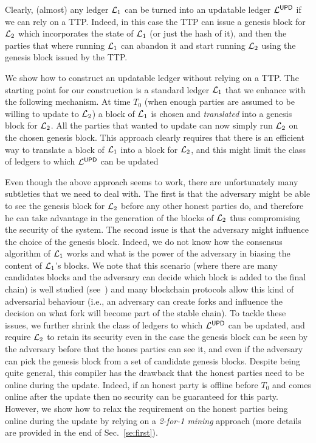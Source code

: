 Clearly, (almost) any ledger $\mathcal{L}_1$ can be turned into an updatable ledger $\mathcal{L}^\mathsf{UPD}$ 
if we can rely on a TTP.
Indeed, in this case the  TTP can issue a genesis block for $\mathcal{L}_2$ which incorporates the state of $\mathcal{L}_1$ (or just the hash of it), and then the parties that where running $\mathcal{L}_1$ can abandon it and start running 
$\mathcal{L}_2$ using the genesis block issued by the TTP.

We show how to construct an updatable ledger without relying on a TTP. The starting point for our construction is
a standard ledger $\mathcal{L}_1$ that we enhance with the following mechanism. At time $T_0$ (when enough parties are assumed to be willing to update to $\mathcal{L}_2$)
a block of $\mathcal{L}_1$ is chosen and \emph{translated} into a genesis block for $\mathcal{L}_2$. All the parties that wanted to update can now simply run $\mathcal{L}_2$ on the chosen genesis block.
This approach clearly requires that there is an efficient way to translate a block of $\mathcal{L}_1$ into a block for $\mathcal{L}_2$, and this might limit the class of ledgers to which $\mathcal{L}^\mathsf{UPD}$ can be updated

Even though the above approach seems to work, there are unfortunately many subtleties that we need to deal with.
The first is that the adversary might be able to see the genesis block for $\mathcal{L}_2$ before any other honest parties do, and therefore he can take advantage in the generation of the blocks of $\mathcal{L}_2$ thus compromising the security of the system. 
The second issue is that the adversary might influence the choice of the genesis block. Indeed, we do not know how the consensus algorithm of $\mathcal{L}_1$ works and what is the power of the adversary in biasing the content of $\mathcal{L}_1$'s blocks. We note that this scenario (where there are many candidates blocks and the adversary can decide which block is added to the final chain) is well studied (see~\cite{EC:GarKiaLeo15}) and many blockchain protocols allow this kind of adversarial behaviour (i.e., an adversary can create forks and influence the decision on what fork will become part of the stable chain). 
To tackle these issues, we further shrink the class of ledgers to which $\mathcal{L}^\mathsf{UPD}$ can be updated, and require
$\mathcal{L}_2$ to retain its security even in the case the genesis block can be seen by the adversary before that the hones parties can see it, and even if the adversary can pick the genesis block from a set of candidate genesis blocks.
Despite being quite general, this compiler has the drawback that the honest parties need to be online during the update. Indeed, if an honest party is offline before $T_0$ and comes online after the update then no security can be guaranteed for this party.
However, we show how to relax the requirement on the honest parties being online during the update by relying on a \emph{2-for-1 mining} approach (more details are provided in the end of Sec.~\ref{se:first}).

